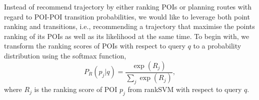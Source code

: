 Instead of recommend trajectory by either ranking POIs or planning routes with regard to POI-POI transition probabilities, 
we would like to leverage both point ranking and transitions,
i.e., recommending a trajectory that maximise the points ranking of its POIs as well as its likelihood at the same time.
To begin with, we transform the ranking scores of POIs with respect to query $q$
to a probability distribution using the softmax function,
\vspace{-0.5em}
\begin{equation*}
\label{eq:rankprob}
P_R(p_j | q) = \frac{\exp(R_j)}{\sum_j \exp(R_j)},
\end{equation*}
where $R_j$ is the ranking score of POI $p_j$ from rankSVM with respect to query $q$.


